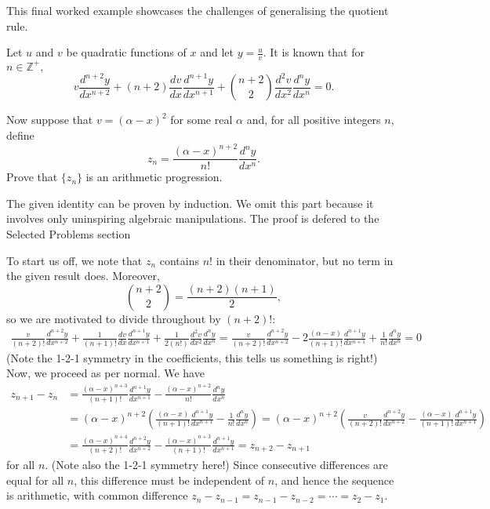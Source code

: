 \documentclass[../jarvis.tex]{subfiles}
\begin{document}
This final worked example showcases the challenges of generalising the quotient rule.
\begin{example}\label{generalised-quotient-rule:p1}
Let $u$ and $v$ be quadratic functions of $x$ and let $y=\frac{u}{v}$. It is known that for $n\in \mathbb{Z}^+,$
$$v\frac{d^{n+2}y}{dx^{n+2}}+(n+2)\frac{dv}{dx}\frac{d^{n+1}y}{dx^{n+1}}+\binom{n+2}{2}\frac{d^{2}v}{dx^{2}}\frac{d^n{y}}{dx^{n}}=0.$$

Now suppose that $v=(\alpha-x)^2$ for some real $\alpha$ and, for all positive integers $n$, define
$$z_n=\frac{(\alpha-x)^{n+2}}{n!}\frac{d^{n}y}{dx^{n}}.$$
Prove that $\{z_n\}$ is an arithmetic progression.
\end{example}
\begin{remark}
The given identity can be proven by induction. We omit this part because it involves only uninspiring algebraic manipulations. The proof is defered to the Selected Problems section
\end{remark}
To start us off, we note that $z_n$ contains $n!$ in their denominator, but no term in the given result does. Moreover, $$\binom{n+2}{2}=\frac{(n+2)(n+1)}{2},$$ so we are motivated to divide throughout by $(n+2)!$:
\begin{align*}
    \frac{v}{(n+2)!}\frac{d^{n+2}y}{dx^{n+2}}+\frac{1}{(n+1)!}\frac{dv}{dx}\frac{d^{n+1}y}{dx^{n+1}}+\frac{1}{2(n!)}\frac{d^{2}v}{dx^{2}}\frac{d^n{y}}{dx^{n}}=\frac{v}{(n+2)!}\frac{d^{n+2}y}{dx^{n+2}}-2\frac{(\alpha-x)}{(n+1)!}\frac{d^{n+1}y}{dx^{n+1}}+\frac{1}{n!}\frac{d^n{y}}{dx^{n}}=0
\end{align*}
(Note the 1-2-1 symmetry in the coefficients, this tells us something is right!) Now, we proceed as per normal. We have
\begin{align*}
    z_{n+1}-z_{n}&=\frac{(\alpha-x)^{n+3}}{(n+1)!}\frac{d^{n+1}y}{dx^{n+1}}-\frac{(\alpha-x)^{n+2}}{n!}\frac{d^ny}{dx^n}\\
    &=(\alpha-x)^{n+2}\left(\frac{(\alpha-x)}{(n+1)!}\frac{d^{n+1}y}{dx^{n+1}}-\frac{1}{n!}\frac{d^ny}{dx^n}\right) = (\alpha-x)^{n+2}\left(\frac{v}{(n+2)!}\frac{d^{n+2}y}{dx^{n+2}}-\frac{(\alpha-x)}{(n+1)!}\frac{d^{n+1}y}{dx^{n+1}}\right)\\
    &=\frac{(\alpha-x)^{n+4}}{(n+2)!}\frac{d^{n+2}y}{dx^{n+2}}-\frac{(\alpha-x)^{n+3}}{(n+1)!}\frac{d^{n+1}y}{dx^{n+1}} = z_{n+2}-z_{n+1}
\end{align*}
for all $n$. (Note also the 1-2-1 symmetry here!) Since consecutive differences are equal for all $n$, this difference must be independent of $n$, and hence the sequence is arithmetic, with common difference $z_{n}-z_{n-1}=z_{n-1}-z_{n-2}=\cdots=z_2-z_1$.
\end{document}
